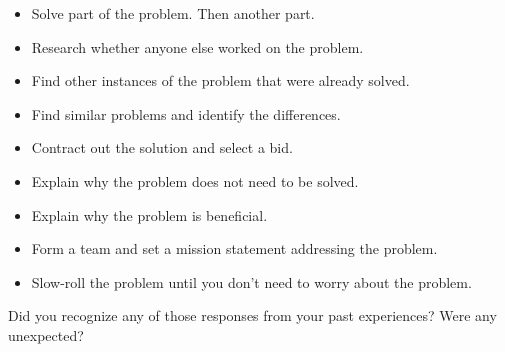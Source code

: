 \begin{itemize}
    \item Solve part of the problem. Then another part.
    \item Research whether anyone else worked on the problem.
    \item Find other instances of the problem that were already solved.
    \item Find similar problems and identify the differences.
    \item Contract out the solution and select a bid.
    \item Explain why the problem does not need to be solved.
    \item Explain why the problem is beneficial. 
    \item Form a team and set a mission statement addressing the problem.
    \item Slow-roll the problem until you don't need to worry about the problem. 
\end{itemize}


Did you recognize any of those responses from your past experiences? 
Were any unexpected?
